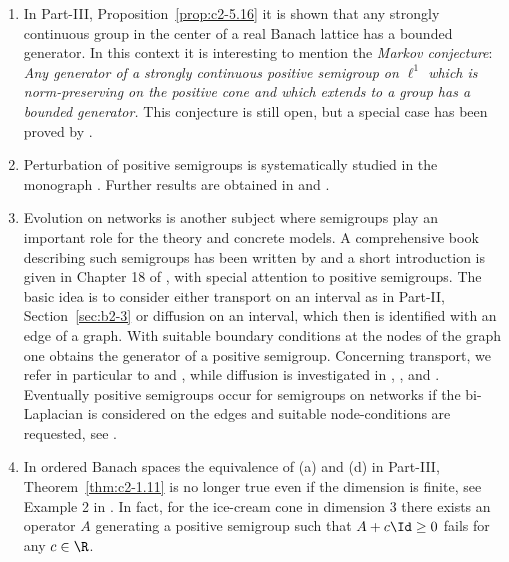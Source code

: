 \begin{enumerate}
\item
In Part-III, Proposition~\ref{prop:c2-5.16} it is shown that any strongly continuous group in the center of a real Banach lattice has a bounded generator. 
In this context it is interesting to mention the \emph{Markov conjecture}: \textit{Any generator of a strongly continuous positive semigroup on $\ell^{1}$ which is norm-preserving on the positive cone and which extends to a group has a bounded generator.} 
This conjecture is still open, but a special case has been proved by \textcite{zbmath07367032}.

\item

Perturbation of positive semigroups is systematically studied in the monograph 
\textcite{zbmath05030445}. Further results are obtained in  \textcite{zbmath07971662}  and \textcite{zbmath08137521}.
\item 
Evolution on networks is another subject where semigroups play an important role for the theory and concrete models. 
A comprehensive book describing such semigroups has been written by \textcite{zbmath06255542} and a short introduction is given in Chapter 18 of \textcite{zbmath06695787}, with special attention to positive semigroups. The basic idea is to consider either transport on an interval as in 
Part-II, Section~\ref{sec:b2-3} or diffusion on an interval, which then is identified with an edge of a graph.  With suitable boundary conditions at the nodes of the graph one obtains the generator of a positive semigroup. Concerning transport, we refer in particular to \textcite{zbmath05773159} and \textcite{zbmath05010468}, while diffusion is investigated in  \textcite{zbmath05180115}, \textcite{zbmath05244453}, \textcite{zbmath07952050} and \textcite{zbmath05167359}.
Eventually positive semigroups occur for semigroups on networks if the bi-Laplacian is considered on the edges and suitable node-conditions are requested, see \textcite{zbmath07189579}.

\item 
In ordered Banach spaces the equivalence of \upshape(a) and \upshape(d) in  Part-III, Theorem~\ref{thm:c2-1.11} is no longer true even if the dimension is finite, see Example 2 in \textcite{zbmath01146453}. 
In fact, for the ice-cream cone in dimension 3 there exists an operator $A$ generating a positive semigroup such that 
$A + c \Id \geq 0$ fails for any $c \in \R$.
\end{enumerate}
